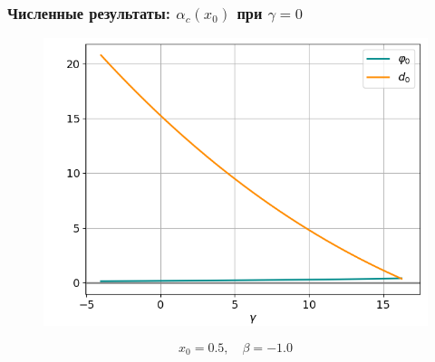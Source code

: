 \documentclass[fullscreen=true, unicode, bookmarks=false]{beamer}
\begin{document}
\begin{frame}
\frametitle{ Численные результаты: $ \alpha_c(x_0) $ при $ \gamma = 0 $ }

\begin{figure} 
\includegraphics[scale=0.5]{oscillating_phi0d0_x0=0,5,beta=-1,0.png}  
\end{figure}

$$ x_0 = 0.5, \quad \beta=-1.0 $$

\end{frame}
\end{document}
